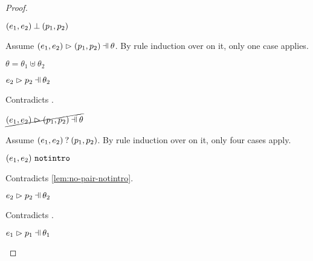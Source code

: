\begin{proof}
\begin{byCases}
\begin{byCases}
\begin{byCases}
\begin{pfsteps*}
            \item $(e_1 , e_2) \mathbin{\bot} (p_1 , p_2)$ 
            \end{pfsteps*}
            Assume $\hpatmatch{\hpair{e_1}{e_2}}{\hpair{p_1}{p_2}}{\theta}$. By rule induction over  on it, only one case applies.
            \begin{byCases}
            \item[\text{(\ref{rule:MPair})}]
                \begin{pfsteps*}
                \item $\theta=\theta_1\uplus\theta_2$
                \item $\hpatmatch{e_2}{p_2}{\theta_2}$ 
                \end{pfsteps*}
                Contradicts .
            \end{byCases}
            \begin{pfsteps*}
            \item $\cancel{\hpatmatch{\hpair{e_1}{e_2}}{\hpair{p_1}{p_2}}{\theta}}$ 
            \end{pfsteps*}
            Assume $(e_1 , e_2) \mathbin{?} (p_1 , p_2)$. By rule induction over  on it, only four cases apply.
            \begin{byCases}
            \item[\text{(\ref{rule:MMNotIntro})}]
                \begin{pfsteps*}
                \item $(e_1 , e_2) ~\mathtt{notintro}$ 
                \end{pfsteps*}
                Contradicts \autoref{lem:no-pair-notintro}.
            \item[\text{(\ref{rule:MMPairL})}]
                \begin{pfsteps*}
                \item $\hpatmatch{e_2}{p_2}{\theta_2}$ 
                \end{pfsteps*}
                Contradicts .
            \item[\text{(\ref{rule:MMPairR})}]
                \begin{pfsteps*}
                \item $\hpatmatch{e_1}{p_1}{\theta_1}$ 

\end{pfsteps*}
\end{byCases}
\end{byCases}
\end{byCases}
\end{byCases}
\end{proof}
